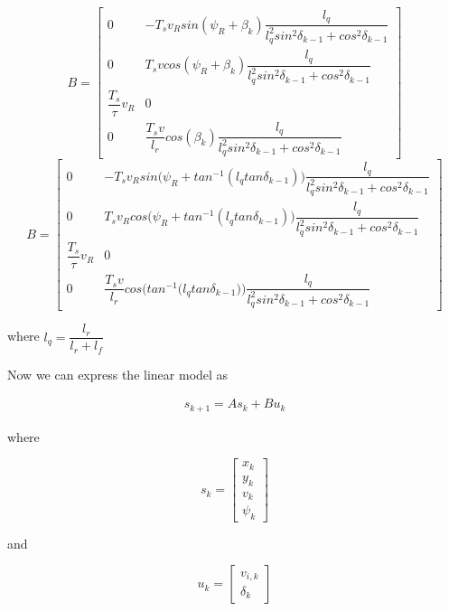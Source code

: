 \begin{equation}
 B =
  \begin{bmatrix}
    0 & -T_s v_R sin(\psi_R + \beta_k) \dfrac{l_q}{l_q^2 sin^2\delta_{k-1} + cos^2\delta_{k-1}} \\
    0 & T_s v cos(\psi_R + \beta_k) \dfrac{l_q}{l_q^2 sin^2\delta_{k-1} + cos^2\delta_{k-1}} \\
    \dfrac{T_s}{\tau} v_R & 0 \\
    0 & \dfrac{T_s v}{l_r} cos(\beta_k) \dfrac{l_q}{l_q^2 sin^2\delta_{k-1} + cos^2\delta_{k-1}}
  \end{bmatrix}
\end{equation}
\begin{equation}
  B =
  \begin{bmatrix}
    0 & -T_s v_R sin\Big(\psi_R + tan^{-1} (l_q tan\delta_{k-1})\Big) \dfrac{l_q}{l_q^2 sin^2\delta_{k-1} + cos^2\delta_{k-1}} \\
    0 & T_s v_R cos\Big(\psi_R + tan^{-1} (l_q tan\delta_{k-1})\Big) \dfrac{l_q}{l_q^2 sin^2\delta_{k-1} + cos^2\delta_{k-1}} \\
    \dfrac{T_s}{\tau} v_R & 0 \\
    0 & \dfrac{T_s v}{l_r} cos\Bigg(tan^{-1} \Big(l_q tan\delta_{k-1}\Big)\Bigg) \dfrac{l_q}{l_q^2 sin^2\delta_{k-1} + cos^2\delta_{k-1}}
  \end{bmatrix}
\end{equation}


where $l_q = \dfrac{l_r}{l_r + l_f}$


Now we can express the linear model as

\begin{align}
  s_{k+1} = A s_k + B u_k
\end{align}

where

\begin{equation}
  s_k=
  \begin{bmatrix}
    x_{k} \\
    y_{k} \\
    v_{k} \\
    \psi_{k}
  \end{bmatrix}
\end{equation}

and

\begin{equation}
  u_k=
  \begin{bmatrix}
    v_{i,k} \\
    \delta_{k}
  \end{bmatrix}
\end{equation}



